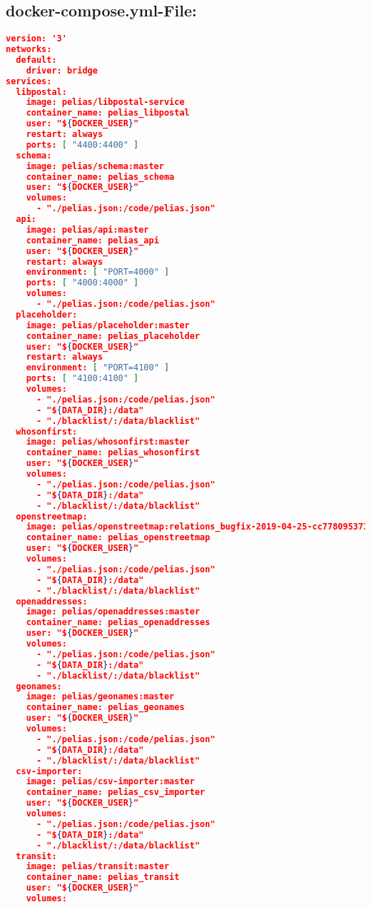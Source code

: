 \subsection{docker-compose.yml-File:}
\begin{lstlisting}[language=json,breaklines=true]
version: '3'
networks:
  default:
    driver: bridge
services:
  libpostal:
    image: pelias/libpostal-service
    container_name: pelias_libpostal
    user: "${DOCKER_USER}"
    restart: always
    ports: [ "4400:4400" ]
  schema:
    image: pelias/schema:master
    container_name: pelias_schema
    user: "${DOCKER_USER}"
    volumes:
      - "./pelias.json:/code/pelias.json"
  api:
    image: pelias/api:master
    container_name: pelias_api
    user: "${DOCKER_USER}"
    restart: always
    environment: [ "PORT=4000" ]
    ports: [ "4000:4000" ]
    volumes:
      - "./pelias.json:/code/pelias.json"
  placeholder:
    image: pelias/placeholder:master
    container_name: pelias_placeholder
    user: "${DOCKER_USER}"
    restart: always
    environment: [ "PORT=4100" ]
    ports: [ "4100:4100" ]
    volumes:
      - "./pelias.json:/code/pelias.json"
      - "${DATA_DIR}:/data"
      - "./blacklist/:/data/blacklist"
  whosonfirst:
    image: pelias/whosonfirst:master
    container_name: pelias_whosonfirst
    user: "${DOCKER_USER}"
    volumes:
      - "./pelias.json:/code/pelias.json"
      - "${DATA_DIR}:/data"
      - "./blacklist/:/data/blacklist"
  openstreetmap:
    image: pelias/openstreetmap:relations_bugfix-2019-04-25-cc778095371c142147e31249947a3b43fb57d46d
    container_name: pelias_openstreetmap
    user: "${DOCKER_USER}"
    volumes:
      - "./pelias.json:/code/pelias.json"
      - "${DATA_DIR}:/data"
      - "./blacklist/:/data/blacklist"
  openaddresses:
    image: pelias/openaddresses:master
    container_name: pelias_openaddresses
    user: "${DOCKER_USER}"
    volumes:
      - "./pelias.json:/code/pelias.json"
      - "${DATA_DIR}:/data"
      - "./blacklist/:/data/blacklist"
  geonames:
    image: pelias/geonames:master
    container_name: pelias_geonames
    user: "${DOCKER_USER}"
    volumes:
      - "./pelias.json:/code/pelias.json"
      - "${DATA_DIR}:/data"
      - "./blacklist/:/data/blacklist"
  csv-importer:
    image: pelias/csv-importer:master
    container_name: pelias_csv_importer
    user: "${DOCKER_USER}"
    volumes:
      - "./pelias.json:/code/pelias.json"
      - "${DATA_DIR}:/data"
      - "./blacklist/:/data/blacklist"
  transit:
    image: pelias/transit:master
    container_name: pelias_transit
    user: "${DOCKER_USER}"
    volumes:

\end{lstlisting}
